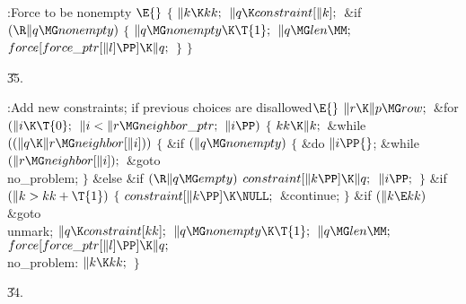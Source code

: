 \B{}:Force  to be nonempty%
\X${}\E{}$\6
${}\{{}$\1\6
${}\|k\K\\{kk};{}$\6
${}\|q\K\\{constraint}[\|k];{}$\6
\&{if} ${}(\R\|q\MG\\{nonempty}){}$\5
${}\{{}$\1\6
${}\|q\MG\\{nonempty}\K\T{1};{}$\6
${}\|q\MG\\{len}\MM;{}$\6
${}\\{force}[\\{force\_ptr}[\|l]\PP]\K\|q;{}$\6
\4${}\}{}$\2\6
\4${}\}{}$\2\par
\U35.\fi

\B{}:Add new constraints;  if
previous choices are disallowed\X${}\E{}$\6
$\|r\K\|p\MG\\{row};{}$\6
\&{for} ${}(\|i\K\T{0};{}$ ${}\|i<\|r\MG\\{neighbor\_ptr};{}$ ${}\|i\PP){}$\5
${}\{{}$\1\6
${}\\{kk}\K\|k;{}$\6
\&{while} ${}((\|q\K\|r\MG\\{neighbor}[\|i])){}$\5
${}\{{}$\1\6
\&{if} ${}(\|q\MG\\{nonempty}){}$\5
${}\{{}$\1\6
\&{do}\5
${}\|i\PP{}$;\5
\5
\&{while} ${}(\|r\MG\\{neighbor}[\|i]);{}$\6
\&{goto} \\{no\_problem};\6
\4${}\}{}$\2\6
\&{else} \&{if} ${}(\R\|q\MG\\{empty}){}$\1\5
${}\\{constraint}[\|k\PP]\K\|q;{}$\2\6
${}\|i\PP;{}$\6
\4${}\}{}$\2\6
\&{if} ${}(\|k>\\{kk}+\T{1}){}$\5
${}\{{}$\1\6
${}\\{constraint}[\|k\PP]\K\NULL;{}$\6
\&{continue};\6
\4${}\}{}$\2\6
\&{if} ${}(\|k\E\\{kk}){}$\1\5
\&{goto} \\{unmark};\2\6
${}\|q\K\\{constraint}[\\{kk}];{}$\6
${}\|q\MG\\{nonempty}\K\T{1};{}$\6
${}\|q\MG\\{len}\MM;{}$\6
${}\\{force}[\\{force\_ptr}[\|l]\PP]\K\|q;{}$\6
\4\\{no\_problem}:\5
${}\|k\K\\{kk};{}$\6
\4${}\}{}$\2\par
\U34.\fi

